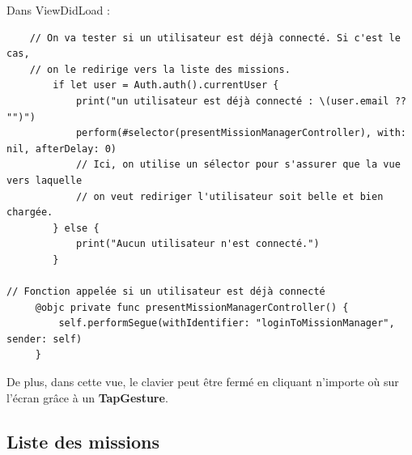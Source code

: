 \documentclass{article}
\begin{document}
Dans ViewDidLoad : 
\begin{verbatim}
    // On va tester si un utilisateur est déjà connecté. Si c'est le cas, 
    // on le redirige vers la liste des missions.
        if let user = Auth.auth().currentUser {
            print("un utilisateur est déjà connecté : \(user.email ?? "")")
            perform(#selector(presentMissionManagerController), with: nil, afterDelay: 0)
            // Ici, on utilise un sélector pour s'assurer que la vue vers laquelle
            // on veut rediriger l'utilisateur soit belle et bien chargée.
        } else {
            print("Aucun utilisateur n'est connecté.")
        }
        
// Fonction appelée si un utilisateur est déjà connecté
     @objc private func presentMissionManagerController() {
         self.performSegue(withIdentifier: "loginToMissionManager", sender: self)
     }
\end{verbatim}

De plus, dans cette vue, le clavier peut être fermé en cliquant n'importe où sur l'écran grâce à un \textbf{TapGesture}. 

\newpage

\subsection{Liste des missions}
\end{document}
